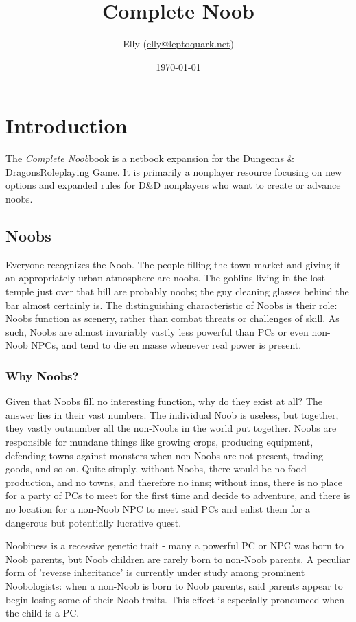 \documentclass[11pt]{report}
\title{Complete Noob}
\author{Elly (\url{elly@leptoquark.net})}
\date{\today}
\begin{document}
\newcommand{\btitle}[0]{\textit{Complete Noob}}
\newcommand{\dandd}[0]{{\sc Dungeons \& Dragons}}
\newcommand{\tblbg}[0]{\rowcolor[rgb]{0.9,0.9,1.0}}

\maketitle
\tableofcontents

\chapter{Introduction}
The \btitle book is a netbook expansion for the \dandd Roleplaying Game. It is
primarily a nonplayer resource focusing on new options and expanded rules for
D\&D nonplayers who want to create or advance noobs.

\section{Noobs}
Everyone recognizes the Noob. The people filling the town market and giving it
an appropriately urban atmosphere are noobs. The goblins living in the lost
temple just over that hill are probably noobs; the guy cleaning glasses behind
the bar almost certainly is. The distinguishing characteristic of Noobs is their
role: Noobs function as scenery, rather than combat threats or challenges of
skill. As such, Noobs are almost invariably vastly less powerful than PCs or
even non-Noob NPCs, and tend to die en masse whenever real power is present.

\subsection{Why Noobs?}
Given that Noobs fill no interesting function, why do they exist at all? The
answer lies in their vast numbers. The individual Noob is useless, but together,
they vastly outnumber all the non-Noobs in the world put together. Noobs are
responsible for mundane things like growing crops, producing equipment,
defending towns against monsters when non-Noobs are not present, trading goods,
and so on. Quite simply, without Noobs, there would be no food production, and
no towns, and therefore no inns; without inns, there is no place for a party of
PCs to meet for the first time and decide to adventure, and there is no location
for a non-Noob NPC to meet said PCs and enlist them for a dangerous but
potentially lucrative quest.

Noobiness is a recessive genetic trait - many a powerful PC or NPC was born to
Noob parents, but Noob children are rarely born to non-Noob parents. A peculiar
form of 'reverse inheritance' is currently under study among prominent
Noobologists: when a non-Noob is born to Noob parents, said parents appear to
begin losing some of their Noob traits. This effect is especially pronounced
when the child is a PC.
\end{document}
